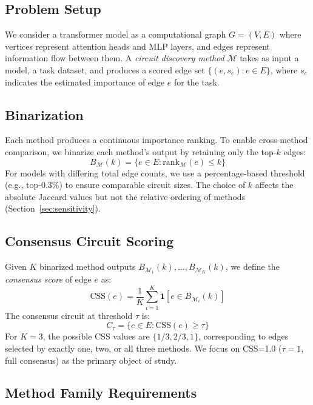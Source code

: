 \documentclass[11pt]{article}
\newcommand{\css}{\textsc{CSS}}
\newcommand{\cssone}{\textsc{CSS}{=}1.0}
\begin{document}
\subsection{Problem Setup}

We consider a transformer model as a computational graph $G = (V, E)$ where vertices represent attention heads and MLP layers, and edges represent information flow between them. A \emph{circuit discovery method} $\mathcal{M}$ takes as input a model, a task dataset, and produces a scored edge set $\{(e, s_e) : e \in E\}$, where $s_e$ indicates the estimated importance of edge $e$ for the task.

\subsection{Binarization}

Each method produces a continuous importance ranking. To enable cross-method comparison, we binarize each method's output by retaining only the top-$k$ edges:
\begin{equation}
    B_{\mathcal{M}}(k) = \{e \in E : \text{rank}_{\mathcal{M}}(e) \leq k\}
\end{equation}
For models with differing total edge counts, we use a percentage-based threshold (e.g., top-0.3\%) to ensure comparable circuit sizes. The choice of $k$ affects the absolute Jaccard values but not the relative ordering of methods (Section~\ref{sec:sensitivity}).

\subsection{Consensus Circuit Scoring}

Given $K$ binarized method outputs $B_{\mathcal{M}_1}(k), \ldots, B_{\mathcal{M}_K}(k)$, we define the \emph{consensus score} of edge $e$ as:
\begin{equation}
    \text{CSS}(e) = \frac{1}{K} \sum_{i=1}^{K} \mathbf{1}[e \in B_{\mathcal{M}_i}(k)]
\end{equation}
The consensus circuit at threshold $\tau$ is:
\begin{equation}
    C_\tau = \{e \in E : \text{CSS}(e) \geq \tau\}
\end{equation}
For $K=3$, the possible \css{} values are $\{1/3, 2/3, 1\}$, corresponding to edges selected by exactly one, two, or all three methods. We focus on \cssone{} ($\tau = 1$, full consensus) as the primary object of study.

\subsection{Method Family Requirements}
\end{document}
